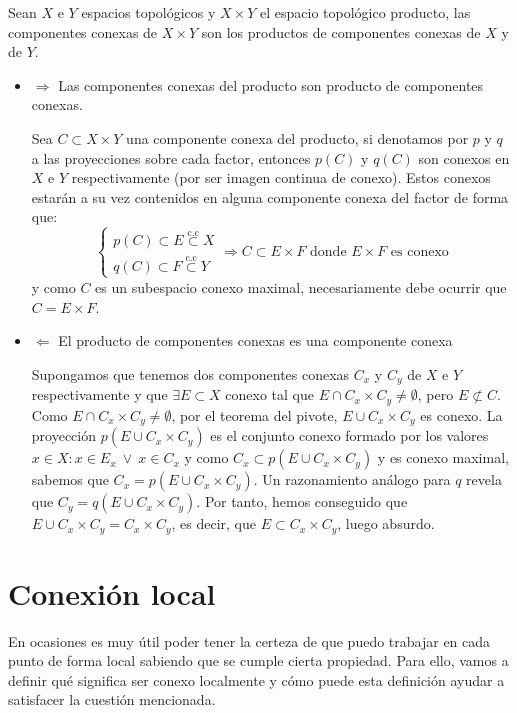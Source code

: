 \begin{prop}
Sean $X$ e $Y$ espacios topológicos y $X\times Y$ el espacio topológico producto, las componentes conexas de $X \times Y$ son los productos de componentes conexas de $X$ y de $Y$.
\end{prop}
\begin{demo}
\begin{itemize}
\item $\Rightarrow $ Las componentes conexas del producto son producto de componentes conexas.

Sea $C \subset X \times Y$ una componente conexa del producto, si denotamos por $p$ y $q$ a las proyecciones sobre cada factor, entonces $p\left( C \right)$ y $q\left( C \right)$ son conexos en $X$ e $Y$ respectivamente (por ser imagen continua de conexo). Estos conexos estarán a su vez contenidos en alguna componente conexa del factor de forma que:
\[
\begin{cases}
    p\left( C \right) \subset E \stackrel{\text{c.c}}{\subset}  X\\
    q\left( C \right) \subset F \stackrel{\text{c.c}}{\subset}  Y
\end{cases} \Rightarrow C \subset E \times F \mbox{ donde } E \times F \mbox{ es conexo}
\]
y como $C$ es un subespacio conexo maximal, necesariamente debe ocurrir que $C = E\times F$.

\item $\Leftarrow$ El producto de componentes conexas es una componente conexa

Supongamos que tenemos dos componentes conexas $C_x$ y $C_y$ de $X$ e $Y$ respectivamente y que $\exists E \subset X$ conexo tal que $E\cap C_x \times C_y \neq \emptyset$, pero $E \not\subset C$. Como $E\cap C_x \times C_y \neq \emptyset$, por el teorema del pivote, $E\cup C_x \times C_y$ es conexo. La proyección $p(E\cup C_x \times C_y)$ es el conjunto conexo formado por los valores $x\in X : x\in E_x \ \vee \ x\in C_x$ y como $C_x \subset p(E\cup C_x \times C_y)$ y es conexo maximal, sabemos que $C_x = p(E\cup C_x \times C_y)$. Un razonamiento análogo para $q$ revela que $C_y = q(E\cup C_x\times C_y)$. Por tanto, hemos conseguido que $E\cup C_x\times C_y = C_x \times C_y$, es decir, que $E\subset C_x \times C_y$, luego absurdo.
\end{itemize}
\end{demo}

\section{Conexión local}%
\label{sec:conexion_local}
En ocasiones es muy útil poder tener la certeza de que puedo trabajar en cada punto de forma local sabiendo que se cumple cierta propiedad. Para ello, vamos a definir qué significa ser conexo localmente y cómo puede esta definición ayudar a satisfacer la cuestión mencionada.

